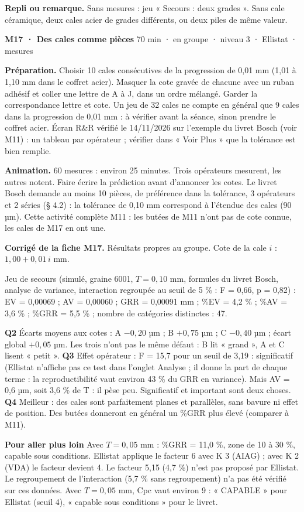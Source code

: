 {\small\textbf{Repli ou remarque.} Sans mesures : jeu « Secours : deux grades ». Sans cale céramique, deux cales acier de grades différents, ou deux piles de même valeur.}\par
\vspace{3pt}
\begin{tcolorbox}[act]\textbf{M17 · Des cales comme pièces} \hfill {\small 70 min · en groupe · niveau 3 · Ellistat · mesures}\end{tcolorbox}
\textbf{Préparation.} Choisir 10 cales consécutives de la progression de 0,01 mm (1,01 à 1,10 mm dans le coffret acier). Masquer la cote gravée de chacune avec un ruban adhésif et coller une lettre de A à J, dans un ordre mélangé. Garder la correspondance lettre et cote. Un jeu de 32 cales ne compte en général que 9 cales dans la progression de 0,01 mm : à vérifier avant la séance, sinon prendre le coffret acier. Écran R\&R vérifié le 14/11/2026 sur l'exemple du livret Bosch (voir M11) : un tableau par opérateur ; vérifier dans « Voir Plus » que la tolérance est bien remplie.\par
\textbf{Animation.} 60 mesures : environ 25 minutes. Trois opérateurs mesurent, les autres notent. Faire écrire la prédiction avant d'annoncer les cotes. Le livret Bosch demande au moins 10 pièces, de préférence dans la tolérance, 3 opérateurs et 2 séries (§ 4.2) : la tolérance de 0,10 mm correspond à l'étendue des cales (90 µm). Cette activité complète M11 : les butées de M11 n'ont pas de cote connue, les cales de M17 en ont une.\par
\textbf{\color{ok}Corrigé de la fiche M17.} Résultats propres au groupe. Cote de la cale $i$ : $1{,}00 + 0{,}01\,i$ mm.\par Jeu de secours (simulé, graine 6001, $T = 0{,}10$ mm, formules du livret Bosch, analyse de variance, interaction regroupée au seuil de 5 \% : F = 0,66, p = 0,82) : EV = 0,00069 ; AV = 0,00060 ; GRR = 0,00091 mm ; \%EV = 4,2 \% ; \%AV = 3,6 \% ; \%GRR = 5,5 \% ; nombre de catégories distinctes : 47.\par \textbf{Q2} Écarts moyens aux cotes : A $-0{,}20$ µm ; B $+0{,}75$ µm ; C $-0{,}40$ µm ; écart global $+0{,}05$ µm. Les trois n'ont pas le même défaut : B lit « grand », A et C lisent « petit ». \textbf{Q3} Effet opérateur : F = 15,7 pour un seuil de 3,19 : significatif (Ellistat n'affiche pas ce test dans l'onglet Analyse ; il donne la part de chaque terme : la reproductibilité vaut environ 43 \% du GRR en variance). Mais AV = 0,6 µm, soit 3,6 \% de T : il pèse peu. Significatif et important sont deux choses. \textbf{Q4} Meilleur : des cales sont parfaitement planes et parallèles, sans bavure ni effet de position. Des butées donneront en général un \%GRR plus élevé (comparer à M11).\par \textbf{Pour aller plus loin} Avec $T = 0{,}05$ mm : \%GRR = 11,0 \%, zone de 10 à 30 \%, capable sous conditions. Ellistat applique le facteur 6 avec K 3 (AIAG) ; avec K 2 (VDA) le facteur devient 4. Le facteur 5,15 (4,7 \%) n'est pas proposé par Ellistat. Le regroupement de l'interaction (5,7 \% sans regroupement) n'a pas été vérifié sur ces données. Avec $T = 0{,}05$ mm, Cpc vaut environ 9 : « CAPABLE » pour Ellistat (seuil 4), « capable sous conditions » pour le livret.\par
